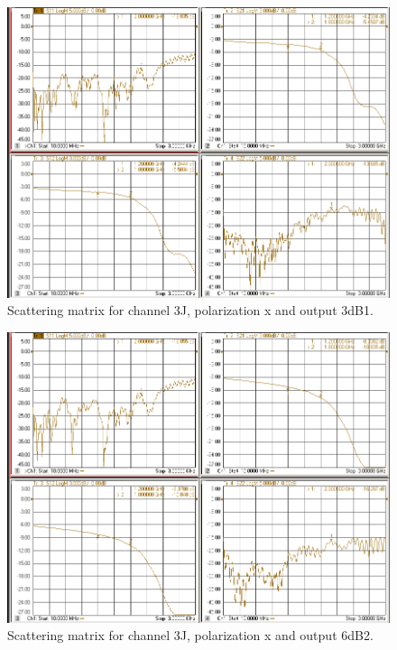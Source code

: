 \documentclass[12pt,a4paper,oneside]{article}
\begin{document}
\begin{figure}[H]
\centering
\includegraphics[width=0.9\linewidth]{VNA_results/3Jx_3dB1.png}
\caption{Scattering matrix for channel 3J, polarization x and output 3dB1.}
\label{fig:3Jx_3dB1}
\end{figure}


\begin{figure}[H]
\centering
\includegraphics[width=0.9\linewidth]{VNA_results/3Jx_6dB2.png}
\caption{Scattering matrix for channel 3J, polarization x and output 6dB2.}
\label{fig:3Jx_6dB2}
\end{figure}
\end{document}
